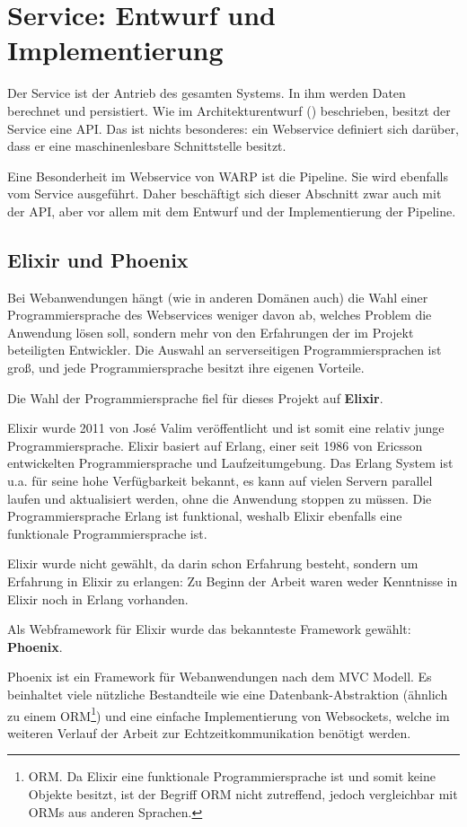 \section{Service: Entwurf und Implementierung}
\label{sec:service}

Der Service ist der Antrieb des gesamten Systems. In ihm werden Daten berechnet und persistiert. Wie im Architekturentwurf () beschrieben, besitzt der Service eine \ac{API}. Das ist nichts besonderes: ein Webservice definiert sich darüber, dass er eine maschinenlesbare Schnittstelle besitzt.

Eine Besonderheit im Webservice von WARP ist die Pipeline. Sie wird ebenfalls vom Service ausgeführt. Daher beschäftigt sich dieser Abschnitt zwar auch mit der \ac{API}, aber vor allem mit dem Entwurf und der Implementierung der Pipeline.

\subsection{Elixir und Phoenix}

Bei Webanwendungen hängt (wie in anderen Domänen auch) die Wahl einer Programmiersprache des Webservices weniger davon ab, welches Problem die Anwendung lösen soll, sondern mehr von den Erfahrungen der im Projekt beteiligten Entwickler. Die Auswahl an serverseitigen Programmiersprachen ist groß, und jede Programmiersprache besitzt ihre eigenen Vorteile.

Die Wahl der Programmiersprache fiel für dieses Projekt auf \textbf{Elixir}.

Elixir wurde 2011 von José Valim veröffentlicht und ist somit eine relativ junge Programmiersprache. Elixir basiert auf Erlang, einer seit 1986 von Ericsson entwickelten Programmiersprache und Laufzeitumgebung. Das Erlang System ist u.a. für seine hohe Verfügbarkeit bekannt, es kann auf vielen Servern parallel laufen und aktualisiert werden, ohne die Anwendung stoppen zu müssen. Die Programmiersprache Erlang ist funktional, weshalb Elixir ebenfalls eine funktionale Programmiersprache ist. \citep{wiki:elixir}

Elixir wurde nicht gewählt, da darin schon Erfahrung besteht, sondern um Erfahrung in Elixir zu erlangen: Zu Beginn der Arbeit waren weder Kenntnisse in Elixir noch in Erlang vorhanden.

Als Webframework für Elixir wurde das bekannteste Framework gewählt: \textbf{Phoenix}.

Phoenix ist ein Framework für Webanwendungen nach dem \ac{MVC} Modell. Es beinhaltet viele nützliche Bestandteile wie eine Datenbank-Abstraktion (ähnlich zu einem \acs{ORM}\footnote{\acf{ORM}. Da Elixir eine funktionale Programmiersprache ist und somit keine Objekte besitzt, ist der Begriff \acs{ORM} nicht zutreffend, jedoch vergleichbar mit ORMs aus anderen Sprachen.}) und eine einfache Implementierung von Websockets, welche im weiteren Verlauf der Arbeit zur Echtzeitkommunikation benötigt werden.

